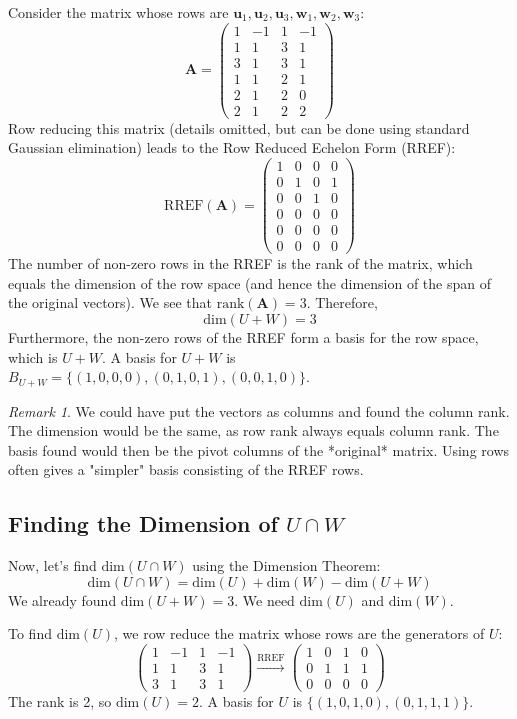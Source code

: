\documentclass[11pt]{article}
\theoremstyle{definition}
\theoremstyle{remark}
\newtheorem{remark}[theorem]{Remark}
\newcommand{\vsdim}{\text{dim}}
\newcommand{\vecu}{\mathbf{u}}
\newcommand{\vecw}{\mathbf{w}}
\newcommand{\matA}{\mathbf{A}}
\begin{document}
Consider the matrix whose rows are $\vecu_1, \vecu_2, \vecu_3, \vecw_1, \vecw_2, \vecw_3$:
\[ \matA = \begin{pmatrix} 1 & -1 & 1 & -1 \\ 1 & 1 & 3 & 1 \\ 3 & 1 & 3 & 1 \\ 1 & 1 & 2 & 1 \\ 2 & 1 & 2 & 0 \\ 2 & 1 & 2 & 2 \end{pmatrix} \]
Row reducing this matrix (details omitted, but can be done using standard Gaussian elimination) leads to the Row Reduced Echelon Form (RREF):
\[ \text{RREF}(\matA) = \begin{pmatrix} 1 & 0 & 0 & 0 \\ 0 & 1 & 0 & 1 \\ 0 & 0 & 1 & 0 \\ 0 & 0 & 0 & 0 \\ 0 & 0 & 0 & 0 \\ 0 & 0 & 0 & 0 \end{pmatrix} \]
The number of non-zero rows in the RREF is the rank of the matrix, which equals the dimension of the row space (and hence the dimension of the span of the original vectors).
We see that $\text{rank}(\matA) = 3$. Therefore,
\[ \vsdim(U+W) = 3 \]
Furthermore, the non-zero rows of the RREF form a basis for the row space, which is $U+W$.
A basis for $U+W$ is $B_{U+W} = \{(1, 0, 0, 0), (0, 1, 0, 1), (0, 0, 1, 0)\}$.

\begin{remark}
We could have put the vectors as columns and found the column rank. The dimension would be the same, as row rank always equals column rank. The basis found would then be the pivot columns of the *original* matrix. Using rows often gives a "simpler" basis consisting of the RREF rows.
\end{remark}

\subsection{Finding the Dimension of $U \cap W$}

Now, let's find $\vsdim(U \cap W)$ using the Dimension Theorem:
\[ \vsdim(U \cap W) = \vsdim(U) + \vsdim(W) - \vsdim(U+W) \]
We already found $\vsdim(U+W) = 3$. We need $\vsdim(U)$ and $\vsdim(W)$.

To find $\vsdim(U)$, we row reduce the matrix whose rows are the generators of $U$:
\[ \begin{pmatrix} 1 & -1 & 1 & -1 \\ 1 & 1 & 3 & 1 \\ 3 & 1 & 3 & 1 \end{pmatrix} \xrightarrow{\text{RREF}} \begin{pmatrix} 1 & 0 & 1 & 0 \\ 0 & 1 & 1 & 1 \\ 0 & 0 & 0 & 0 \end{pmatrix} \]
The rank is 2, so $\vsdim(U) = 2$. A basis for $U$ is $\{(1, 0, 1, 0), (0, 1, 1, 1)\}$.
\end{document}
